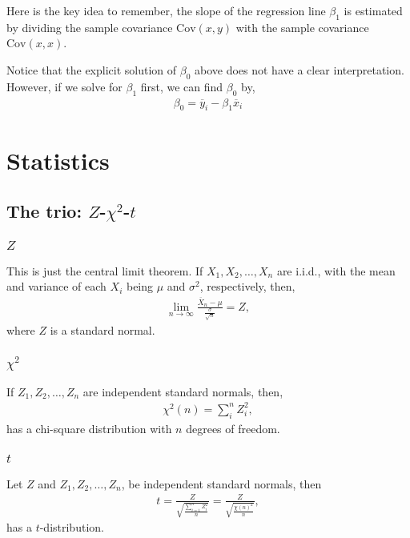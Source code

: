 \documentclass{amsart}
\theoremstyle{plain}
\numberwithin{equation}{section}
\begin{document}
Here is the key idea to remember, the slope of the regression line $\beta_1$ 
is estimated by dividing the sample covariance $\mathrm{Cov}(x,y)$ with the 
sample covariance $\mathrm{Cov}(x, x)$.

Notice that the explicit solution of $\beta_0$ above does not 
have a clear interpretation. However, if we solve for $\beta_1$ first, 
we can find $\beta_0$ by,
\begin{align*}
\beta_0 = \overline{y}_i - \beta_1 \overline{x}_i
\end{align*}

\section{Statistics}

\subsection{The trio: $Z$-$\chi^2$-$t$}
\subsubsection{$Z$}
This is just the central limit theorem. If 
$X_1, X_2, \ldots, X_n$ are i.i.d., with the 
mean and variance of each $X_i$ being $\mu$ and 
$\sigma^2$, respectively, then,
\begin{align*}
\lim_{n \to \infty} \frac{\overline{X}_n-\mu}{\frac{\sigma}{\sqrt{n}}} = Z,
\end{align*}
where $Z$ is a standard normal. 
\subsubsection{$\chi^2$}
If $Z_1, Z_2, \ldots, Z_n$ are independent standard normals,
then, 
\begin{align*}
\chi^2(n) = \sum_{i}^{n} Z_i ^2,
\end{align*}
has a chi-square distribution with $n$ degrees of freedom.

\subsubsection{$t$}
Let $Z$ and $Z_1, Z_2, \ldots, Z_n$, be independent
standard normals, then
\begin{align*}
t = \frac{Z}{\sqrt{\frac{\sum_{i=1}^{n} Z_i ^2}{n}}}
= \frac{Z}{\sqrt{\frac{\chi(n)^2}{n}}},
\end{align*}
has a $t$-distribution. 
\end{document}
